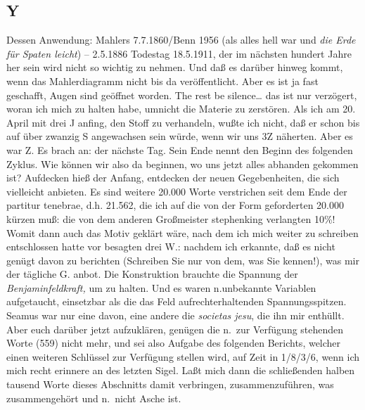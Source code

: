 \documentclass[
]{article}
\author{}
\date{\vspace{-2.5em}}
\begin{document}
\subsection{Y}\label{y}

Dessen Anwendung: Mahlers 7.7.1860/Benn 1956 (als alles hell war und
\emph{die Erde für Spaten leicht}) -- 2.5.1886 Todestag 18.5.1911, der
im nächsten hundert Jahre her sein wird nicht so wichtig zu nehmen. Und
daß es darüber hinweg kommt, wenn das Mahlerdiagramm nicht bis da
veröffentlicht. Aber es ist ja fast geschafft, Augen sind geöffnet
worden. The rest be silence\ldots{} das ist nur verzögert, woran ich
mich zu halten habe, umnicht die Materie zu zerstören. Als ich am 20.
April mit drei J anfing, den Stoff zu verhandeln, wußte ich nicht, daß
er schon bis auf über zwanzig S angewachsen sein würde, wenn wir uns 3Z
näherten. Aber es war Z. Es brach an: der nächste Tag. Sein Ende nennt
den Beginn des folgenden Zyklus. Wie können wir also da beginnen, wo uns
jetzt alles abhanden gekommen ist? Aufdecken hieß der Anfang, entdecken
der neuen Gegebenheiten, die sich vielleicht anbieten. Es sind weitere
20.000 Worte verstrichen seit dem Ende der partitur tenebrae, d.h.
21.562, die ich auf die von der Form geforderten 20.000 kürzen muß: die
von dem anderen Großmeister stephenking verlangten 10\%! Womit dann auch
das Motiv geklärt wäre, nach dem ich mich weiter zu schreiben
entschlossen hatte vor besagten drei W.: nachdem ich erkannte, daß es
nicht genügt davon zu berichten (Schreiben Sie nur von dem, was Sie
kennen!), was mir der tägliche G. anbot. Die Konstruktion brauchte die
Spannung der \emph{Benjaminfeldkraft,} um zu halten. Und es waren
n.unbekannte Variablen aufgetaucht, einsetzbar als die das Feld
aufrechterhaltenden Spannungsspitzen. Seamus war nur eine davon, eine
andere die \emph{societas jesu}, die ihn mir enthüllt. Aber euch darüber
jetzt aufzuklären, genügen die n.~zur Verfügung stehenden Worte (559)
nicht mehr, und sei also Aufgabe des folgenden Berichts, welcher einen
weiteren Schlüssel zur Verfügung stellen wird, auf Zeit in 1/8/3/6, wenn
ich mich recht erinnere an des letzten Sigel. Laßt mich dann die
schließenden halben tausend Worte dieses Abschnitts damit verbringen,
zusammenzuführen, was zusammengehört und n.~nicht Asche ist.
\end{document}
